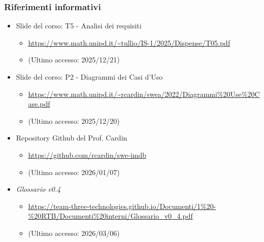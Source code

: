 \documentclass[a4paper,12pt]{article}
\begin{document}
{{            \subsubsection{Riferimenti informativi} {
                \begin{itemize}
                    \item Slide del corso: T5 - Analisi dei requisiti
                    \begin{itemize}
                        \item \url{https://www.math.unipd.it/~tullio/IS-1/2025/Dispense/T05.pdf}
                        \item[] (Ultimo accesso: 2025/12/21)
                    \end{itemize}
                    \item Slide del corso: P2 - Diagrammi dei Casi d'Uso
                    \begin{itemize}
                        \item \url{https://www.math.unipd.it/~rcardin/swea/2022/Diagrammi\%20Use\%20Case.pdf}
                        \item[] (Ultimo accesso: 2025/12/20)
                    \end{itemize}
                    \item Repository Github del Prof. Cardin
                    \begin{itemize}
                        \item \url{https://github.com/rcardin/swe-imdb}
                        \item[] (Ultimo accesso: 2026/01/07)
                    \end{itemize}
                    \item \textit{Glossario v0.4}
                    \begin{itemize}
                        \item \url{https://team-three-technologies.github.io/Documenti/1%20-%20RTB/Documenti%20interni/Glossario_v0_4.pdf}
                        \item[] (Ultimo accesso: 2026/03/06)
                    \end{itemize}
                \end{itemize}
            }
        }
    }

    \newpage
\end{document}
